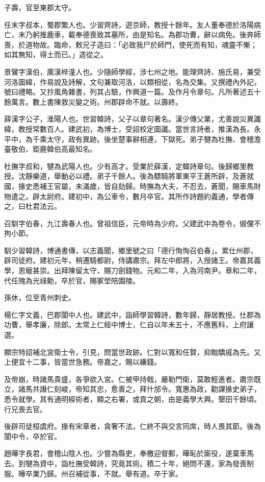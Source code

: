 \begin{pinyinscope}
子壽，官至東郡太守。

任末字叔本，蜀郡繁人也。少習齊詩，遊京師，教授十餘年。友人董奉德於洛陽病亡，末乃躬推鹿車，載奉德喪致其墓所，由是知名。為郡功曹，辭以病免。後奔師喪，於道物故。臨命，敕兄子造曰：「必致我尸於師門，使死而有知，魂靈不慚；如其無知，得土而已。」造從之。

景鸞字漢伯，廣漢梓潼人也。少隨師學經，涉七州之地。能理齊詩、施氏易，兼受河洛圖緯，作易說及詩解，文句兼取河洛，以類相從，名為交集。又撰禮內外記，號曰禮略。又抄風角雜書，列其占驗，作興道一篇。及作月令章句。凡所著述五十餘萬言。數上書陳救災變之術。州郡辟命不就。以壽終。

薛漢字公子，淮陽人也。世習韓詩，父子以章句著名。漢少傳父業，尤善說災異讖緯，教授常數百人。建武初，為博士，受詔校定圖讖。當世言詩者，推漢為長。永平中，為千乘太守，政有異跡。後坐楚事辭相連，下獄死。弟子犍為杜撫、會稽澹臺敬伯、鉅鹿韓伯高最知名。

杜撫字叔和，犍為武陽人也。少有高才。受業於薛漢，定韓詩章句。後歸鄉里教授。沈靜樂道，舉動必以禮。弟子千餘人。後為驃騎將軍東平王蒼所辟，及蒼就國，掾史悉補王官屬，未滿歲，皆自劾歸。時撫為大夫，不忍去，蒼聞，賜車馬財物遣之。辟太尉府。建初中，為公車令，數月卒官。其所作詩題約義通，學者傳之，曰杜君法云。

召馴字伯春，九江壽春人也。曾祖信臣，元帝時為少府。父建武中為卷令，俶儻不拘小節。

馴少習韓詩，博通書傳，以志義聞，鄉里號之曰「德行恂恂召伯春」。累仕州郡，辟司徒府。建初元年，稍遷騎都尉，侍講肅宗。拜左中郎將，入授諸王。帝嘉其義學，恩寵甚崇。出拜陳留太守，賜刀劍錢物。元和二年，入為河南尹。章和二年，代任隗為光祿勳，卒於官，賜冢塋陪園陵。

孫休，位至青州刺史。

楊仁字文義，巴郡閬中人也。建武中，詣師學習韓詩，數年歸，靜居教授。仕郡為功曹，舉孝廉，除郎。太常上仁經中博士，仁自以年未五十，不應舊科，上府讓選。

顯宗特詔補北宮衛士令，引見，問當世政跡。仁對以寬和任賢，抑黜驕戚為先。又上便宜十二事，皆當世急務。帝嘉之，賜以縑錢。

及帝崩，時諸馬貴盛，各爭欲入宮。仁被甲持戟，嚴勒門衛，莫敢輕進者。肅宗既立，諸馬共譖仁刻峻，帝知其忠，愈善之，拜什邡令。寬惠為政，勸課掾史弟子，悉令就學。其有通明經術者，顯之右署，或貢之朝，由是義學大興。墾田千餘頃。行兄喪去官。

後辟司徒桓虞府。掾有宋章者，貪奢不法，仁終不與交言同席，時人畏其節。後為閬中令，卒於官。

趙曄字長君，會稽山陰人也。少嘗為縣吏，奉檄迎督郵，曄恥於廝役，遂棄車馬去。到犍為資中，詣杜撫受韓詩，究竟其術。積二十年，絕問不還，家為發喪制服。曄卒業乃歸。州召補從事，不就。舉有道。卒于家。


\end{pinyinscope}
